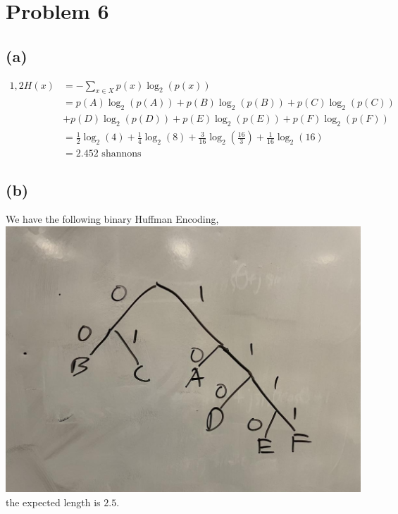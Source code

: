 \section*{Problem 6}
\subsection*{(a)}
\begin{align*}1,2
	H(x)&=-\sum_{x\in X} p(x)\log_2(p(x))\\
	&=p(A)\log_2(p(A))+p(B)\log_2(p(B))+p(C)\log_2(p(C))\\&+p(D)\log_2(p(D))+p(E)\log_2(p(E))+p(F)\log_2(p(F))\\
	&=\frac{1}{2}\log_2(4)+\frac{1}{4}\log_2(8)+\frac{3}{16}\log_2(\frac{16}{3})+\frac{1}{16}\log_2(16)\\
	&=\boxed{2.452\text{ shannons}}
\end{align*}
\subsection*{(b)}
We have the following binary Huffman Encoding,\\
\includegraphics[scale=0.25]{fig1.jpg}\\

the expected length is $\boxed{2.5}$.

